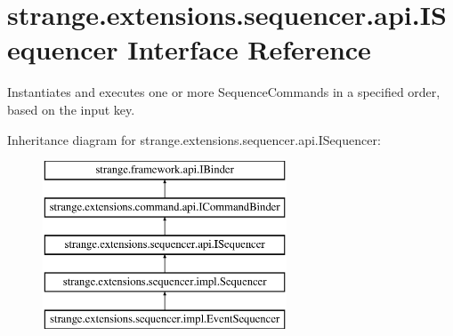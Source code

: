 \hypertarget{interfacestrange_1_1extensions_1_1sequencer_1_1api_1_1_i_sequencer}{\section{strange.\-extensions.\-sequencer.\-api.\-I\-Sequencer Interface Reference}
\label{interfacestrange_1_1extensions_1_1sequencer_1_1api_1_1_i_sequencer}
}


Instantiates and executes one or more Sequence\-Commands in a specified order, based on the input key.  


Inheritance diagram for strange.\-extensions.\-sequencer.\-api.\-I\-Sequencer\-:\begin{figure}[H]
\begin{center}
\leavevmode
\includegraphics[height=5.000000cm]{interfacestrange_1_1extensions_1_1sequencer_1_1api_1_1_i_sequencer}
\end{center}
\end{figure}
